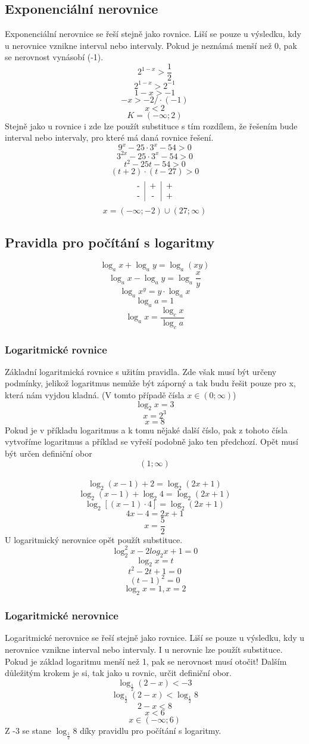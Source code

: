 \subsection {Exponenciální nerovnice}
Exponenciální nerovnice se řeší stejně jako rovnice. Liší se pouze u výsledku, kdy u nerovnice vznikne interval nebo intervaly. Pokud je neznámá menší než 0, pak se nerovnost vynásobí (-1).
$$2^{1-x}>\frac{1}{2}$$
$$2^{1-x}>2^{-1}$$
$$1-x>-1$$
$$-x>-2 /\cdot(-1)$$
$$x<2$$
$$K=(-\infty;2)$$
Stejně jako u rovnice i zde lze použít substituce s tím rozdílem, že řešením bude interval nebo intervaly, pro které má daná rovnice řešení.
$$9^x-25\cdot3^x-54>0$$
$$3^{2x}-25\cdot3^x-54>0$$
$$t^2-25t-54>0$$
$$(t+2)\cdot(t-27)>0$$
$$\begin{tabular}{c|c|c}
    - & + & + \\
    - & - & + 
\end{tabular}$$
$$x=(-\infty;-2)\cup(27;\infty)$$
\subsection {Pravidla pro počítání s logaritmy}
$$\log_{a}x+\log _{a}y=\log_{a}(xy)$$
$$\log_{a}x-\log_{a}y=\log_{a}\frac{x}{y}$$
$$\log_{a}x^y=y\cdot\log_{a}x$$
$$\log_{a}a=1$$
$$\log_{a}x=\frac{\log_c x}{\log_c a}$$
\subsubsection{Logaritmické rovnice}
Základní logaritmická rovnice s užitím pravidla. Zde však musí být určeny podmínky, jelikož logaritmus nemůže být záporný a tak budu řešit pouze pro x, která nám vyjdou kladná. (V tomto případě čísla $x \in (0;\infty)$)
$$\log_{2}x=3$$
$$x=2^3$$
$$x=8$$
Pokud je v příkladu logaritmus a k tomu nějaké další číslo, pak z tohoto čísla vytvoříme logaritmus a příklad se vyřeší podobně jako ten předchozí. Opět musí být určen definiční obor $$(1;\infty)$$\\
$$\log_{2}(x-1)+2=\log_{2}(2x+1)$$
$$\log_{2}(x-1)+\log_{2}4=\log_{2}(2x+1)$$
$$\log_{2}[(x-1)\cdot4]=\log_{2}(2x+1)$$
$$4x-4=2x+1$$
$$x=\frac{5}{2}$$
U logaritmický nerovnice opět použít substituce.
$$\log_{2}^2x-2log_{2}x+1=0$$
$$\log_{2}x=t$$
$$t^2-2t+1=0$$
$$(t-1)^2=0$$
$$\log_{2}x=1, x=2$$
\subsubsection{Logaritmické nerovnice}
Logaritmické nerovnice se řeší stejně jako rovnice. Liší se pouze u výsledku, kdy u nerovnice vznikne interval nebo intervaly. I u nerovnic lze použít substituce. Pokud je základ logaritmu menší než 1, pak se nerovnost musí otočit! Dalším důležitým krokem je si, tak jako u rovnic, určit definiční obor.
$$\log_{\frac{1}{2}}(2-x)<-3$$
$$\log_{\frac{1}{2}}(2-x)<\log_{\frac{1}{2}}8$$
$$2-x<8$$
$$x<6$$
$$x \in(-\infty;6)$$
Z -3 se stane $\log_{\frac{1}{2}}8$ díky pravidlu pro počítání s logaritmy.

